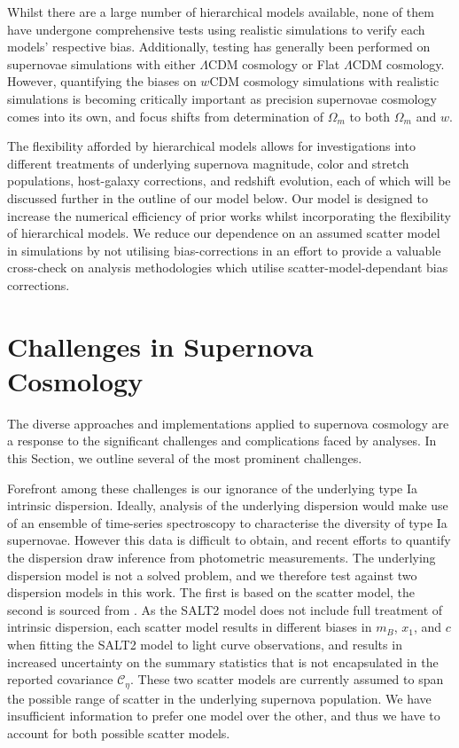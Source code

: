 \documentclass[a4paper,fleqn,usenatbib,manuscript]{emulateapj}
\newcommand{\gten}{\citetalias{Guy2010}}
\newcommand{\celeven}{\citetalias{Chotard2011}}
\begin{document}
Whilst there are a large number of hierarchical models available, none of them have undergone comprehensive tests using realistic simulations to verify each models' respective bias. Additionally, testing has generally been performed on supernovae simulations with either $\Lambda$CDM cosmology or Flat $\Lambda$CDM cosmology. However, quantifying the biases on $w$CDM cosmology simulations with realistic simulations is becoming critically important as precision supernovae cosmology comes into its own, and focus shifts from determination of $\Omega_m$ to both $\Omega_m$ and $w$.


The flexibility afforded by hierarchical models allows for investigations into different treatments of underlying supernova magnitude, color and stretch populations, host-galaxy corrections, and redshift evolution, each of which will be discussed further in the outline of our model below. Our model is designed to increase the numerical efficiency of prior works whilst incorporating the flexibility of hierarchical models. We reduce our dependence on an assumed scatter model in simulations by not utilising bias-corrections in an effort to provide a valuable cross-check on analysis methodologies which utilise scatter-model-dependant bias corrections.





\section{Challenges in Supernova Cosmology}
\label{sec:challenges}


 The diverse approaches and implementations applied to supernova cosmology are a response to the significant challenges and complications faced by analyses. In this Section, we outline several of the most prominent challenges. 

 Forefront among these challenges is our ignorance of the underlying type Ia intrinsic dispersion. Ideally, analysis of the underlying dispersion would make use of an ensemble of time-series spectroscopy to characterise the diversity of type Ia supernovae. However this data is difficult to obtain, and recent efforts to quantify the dispersion draw inference from photometric measurements. The underlying dispersion model is not a solved problem, and we therefore test against two dispersion models in this work. The first is based on the \citet[][hereafter denoted {\gten}]{Guy2010} scatter model, the second is sourced from \citet[][hereafter denoted {\celeven}]{Chotard2011}. As the SALT2 model does not include full treatment of intrinsic dispersion, each scatter model results in different biases in $m_B$, $x_1$, and $c$ when fitting the SALT2 model to light curve observations, and results in increased uncertainty on the summary statistics that is not encapsulated in the reported covariance $\mathcal{C_\eta}$. These two scatter models are currently assumed to span the possible range of scatter in the underlying supernova population. We have insufficient information to prefer one model over the other, and thus we have to account for both possible scatter models.
\end{document}
